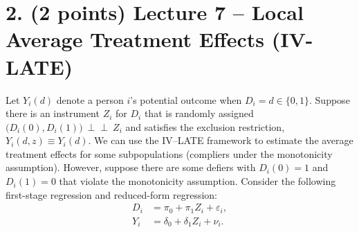 \documentclass[12pt]{article}
\begin{document}
\section*{2. (2 points) Lecture 7 -- Local Average Treatment Effects (IV-LATE)}
Let $Y_i(d)$ denote a person $i$'s potential outcome when $D_i=d\in\{0,1\}$. Suppose there is an instrument $Z_i$ for $D_i$ that is randomly assigned $\big(D_i(0),D_i(1)\big)\ \perp\!\!\!\perp\ Z_i$ and satisfies the exclusion restriction, $Y_i(d,z)\equiv Y_i(d)$. We can use the IV--LATE framework to estimate the average treatment effects for some subpopulations (compliers under the monotonicity assumption). However, suppose there are some defiers with $D_i(0)=1$ and $D_i(1)=0$ that violate the monotonicity assumption. Consider the following first-stage regression and reduced-form regression:
\begin{align*}
  D_i &= \pi_0 + \pi_1 Z_i + \varepsilon_i,\\
  Y_i &= \delta_0 + \delta_1 Z_i + \nu_i.
\end{align*}
\end{document}
